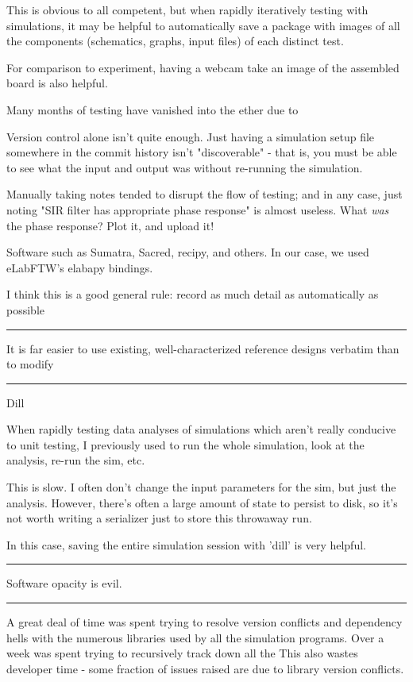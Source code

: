 \documentclass[paper.tex]{subfiles}
\begin{document}
This is obvious to all competent, but when rapidly iteratively testing with simulations, it may be helpful to automatically save a package with images of all the components (schematics, graphs, input files) of each distinct test. 

For comparison to experiment, having a webcam take an image of the assembled board is also helpful. 

Many months of testing have vanished into the ether due to 

Version control alone isn't quite enough. Just having a simulation setup file somewhere in the commit history isn't "discoverable" - that is, you must be able to see what the input and output was without re-running the simulation. 

Manually taking notes tended to disrupt the flow of testing; and in any case, just noting "SIR filter has appropriate phase response" is almost useless. What {\it was} the phase response? Plot it, and upload it!

Software such as Sumatra, Sacred, recipy, and others. In our case, we used eLabFTW's elabapy bindings.

I think this is a good general rule: record as much detail as automatically as possible

\rule{\linewidth}{0.2pt}

It is far easier to use existing, well-characterized reference designs verbatim than to modify 

\rule{\linewidth}{0.2pt}

Dill

When rapidly testing data analyses of simulations which aren't really conducive to unit testing, I previously used to run the whole simulation, look at the analysis, re-run the sim, etc.

This is slow. I often don't change the input parameters for the sim, but just the analysis. However, there's often a large amount of state to persist to disk, so it's not worth writing a serializer just to store this throwaway run.

In this case, saving the entire simulation session with 'dill' is very helpful.

\rule{\linewidth}{0.2pt}

Software opacity is evil.

\rule{\linewidth}{0.2pt}

A great deal of time was spent trying to resolve version conflicts and dependency hells with the numerous libraries used by all the simulation programs. Over a week was spent trying to recursively track down all the This also wastes developer time - some fraction of issues raised are due to library version conflicts. 
\end{document}
